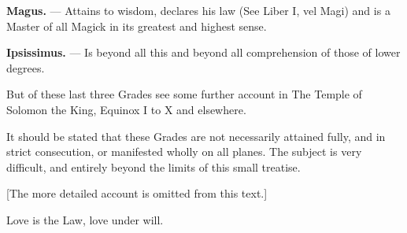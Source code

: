 \textbf{Magus.} --- Attains to wisdom, declares his law (See Liber I, vel Magi) and is a Master of all Magick in its greatest and
highest sense.

\textbf{Ipsissimus.} --- Is beyond all this and beyond all comprehension of those of lower degrees.

But of these last three Grades see some further account in The Temple of Solomon the King, Equinox I to X and elsewhere.

It should be stated that these Grades are not necessarily attained fully, and in strict consecution, or manifested wholly on all planes. The subject is very difficult, and entirely beyond the limits of this small treatise.

[The more detailed account is omitted from this text.]

Love is the Law, love under will.
